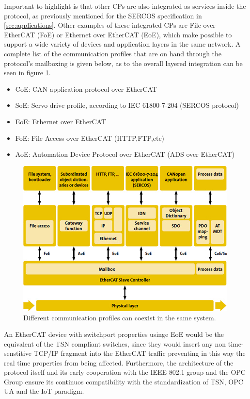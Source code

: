 Important to highlight is that other CPs are also integrated as services inside the protocol, as previously mentioned for 
the SERCOS specification in \ref{sec:applications}. 
Other examples of these integrated CPs are File over EtherCAT (FoE) or Ethernet over EtherCAT (EoE), which
make possible to support a wide variety of devices and application layers in the same network\cite{beckhoff_compatibility}. %
A complete list of the communication profiles that are on hand
through the protocol's mailboxing is given below, as to the overall layered integration can be seen in figure \ref{fig:ecatprofiles}.
\begin{itemize}
    \item CoE: CAN application protocol over EtherCAT
    \item SoE: Servo drive profile, according to IEC 61800-7-204 (SERCOS protocol)
    \item EoE: Ethernet over EtherCAT
    \item FoE: File Access over EtherCAT (HTTP,FTP,etc)
    \item AoE: Automation Device Protocol over EtherCAT (ADS over EtherCAT)
\end{itemize}

\begin{figure}[ht]
    \centering
    \includegraphics[width=.65\textwidth]{imgs/intro-ecatprofiles.jpg}
    \caption{Different communication profiles can coexist in the same system.}
    \label{fig:ecatprofiles}
\end{figure}

An EtherCAT device with switchport properties usinge EoE would be the equivalent of the TSN compliant
switches, since they would insert any non time-senstitive TCP/IP fragment into the EtherCAT traffic preventing
in this way the real time properties from being affected. Furthermore, the architecture of the protocol itself and
its early cooperation with the IEEE 802.1 group and the OPC Group ensure its continuos compatibility with the
standardization of TSN, OPC UA and the IoT paradigm.\cite{beckhoff_compatibility}%

